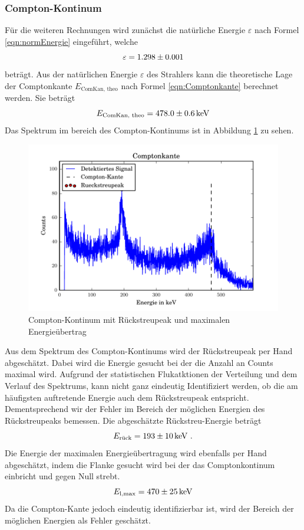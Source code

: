 \subsubsection{Compton-Kontinum}
Für die weiteren Rechnungen wird zunächst die natürliche Energie $\varepsilon$ nach Formel \ref{eqn:normEnergie} eingeführt, welche
\begin{equation}
\varepsilon = \num{1.298 +- 0.001}
  \label{eqn:nE}
\end{equation}
beträgt. Aus der natürlichen Energie $\varepsilon$ des Strahlers kann die theoretische Lage der Comptonkante $E_\text{ComKan, theo}$ nach Formel \ref{eqn:Comptonkante} berechnet werden. Sie beträgt
\begin{equation}
  E_\text{ComKan, theo} = \num{478 +- 0.6} \, \text{keV}
  \label{eqn:KanTheo}
\end{equation}
Das Spektrum im bereich des Compton-Kontinums ist in Abbildung \ref{fig:Compt} zu sehen.

\begin{figure}[htpb]
  \centering
  \includegraphics[width=\textwidth]{./build/Compton.pdf}
  \caption{Compton-Kontinum mit Rückstreupeak und maximalen Energieübertrag}
  \label{fig:Compt}
\end{figure}

Aus dem Spektrum des Compton-Kontinums wird der Rückstreupeak per Hand abgeschätzt. Dabei wird die Energie gesucht bei der die Anzahl an Counts maximal wird. Aufgrund der statistischen Flukatktionen der Verteilung und dem Verlauf des Spektrums, kann nicht ganz eindeutig Identifiziert werden, ob die am häufigsten auftretende Energie auch dem Rückstreupeak entspricht. Dementsprechend wir der Fehler im Bereich der möglichen Energien des Rückstreupeaks bemessen. Die abgeschätzte Rückstreu-Energie beträgt 
\begin{equation}
  E_\text{rück} = \num{193 +- 10} \, \text{keV} \ .
  \label{eqn:KanExp}
\end{equation}
Die Energie der maximalen Energieübertragung wird ebenfalls per Hand abgeschätzt, indem die Flanke gesucht wird bei der das Comptonkontinum einbricht und gegen Null strebt. 
\begin{equation}
  E_\text{l,max} = \num{470 +- 25} \, \text{keV}
  \label{eqn:RückExp}
\end{equation}
Da die Compton-Kante jedoch eindeutig identifizierbar ist, wird der Bereich der möglichen Energien als Fehler geschätzt.


